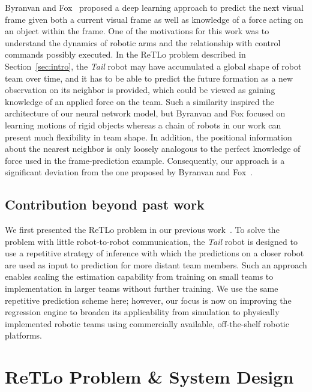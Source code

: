 \documentclass[letterpaper, 10 pt, conference]{ieeeconf}  %
\begin{document}
    Byranvan and Fox~\cite{BF17} proposed a deep learning approach to
    predict the next visual frame given both a current visual frame as
    well as knowledge of a force acting on an object within the frame.
    One of the motivations for this work was to understand the dynamics
    of robotic arms and the relationship with control commands possibly
    executed. In the ReTLo problem described in Section~\ref{sec:intro},
    the \emph{Tail} robot may have accumulated a global shape of robot
    team over time, and it has to be able to predict the future
    formation as a new observation on its neighbor is provided, which
    could be viewed as gaining knowledge of an applied force on the
    team. Such a similarity inspired the architecture of our neural
    network model, but Byranvan and Fox focused on learning motions of
    rigid objects whereas a chain of robots in our work can present much
    flexibility in team shape. In addition, the positional information
    about the nearest neighbor is only loosely analogous to the perfect
    knowledge of force used in the frame-prediction example.
    Consequently, our approach is a significant deviation from the one
    proposed by Byranvan and Fox~\cite{BF17}.

	\subsection{Contribution beyond past work}
	\label{sec:scalable_teammate_localization}

    We first presented the ReTLo problem in our previous
    work~\cite{CPR17}. To solve the problem with little robot-to-robot
    communication, the \emph{Tail} robot is designed to use a repetitive
    strategy of inference with which the predictions on a closer robot
    are used as input to prediction for more distant team members. Such
    an approach enables scaling the estimation capability from training
    on small teams to implementation in larger teams without further
    training. We use the same repetitive prediction scheme here;
    however, our focus is now on improving the regression engine to
    broaden its applicability from simulation to physically implemented
    robotic teams using commercially available, off-the-shelf robotic
    platforms.

	\section{ReTLo Problem \& System Design}
	\label{sec:retlo_problem}
\end{document}
